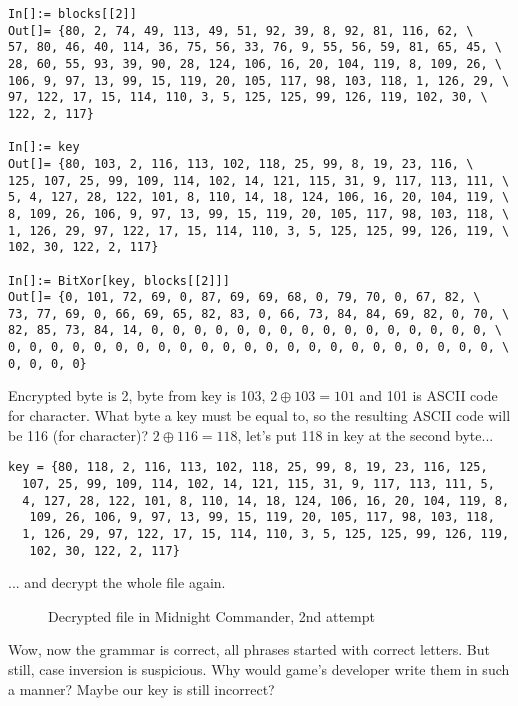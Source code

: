 \begin{lstlisting}
In[]:= blocks[[2]]
Out[]= {80, 2, 74, 49, 113, 49, 51, 92, 39, 8, 92, 81, 116, 62, \
57, 80, 46, 40, 114, 36, 75, 56, 33, 76, 9, 55, 56, 59, 81, 65, 45, \
28, 60, 55, 93, 39, 90, 28, 124, 106, 16, 20, 104, 119, 8, 109, 26, \
106, 9, 97, 13, 99, 15, 119, 20, 105, 117, 98, 103, 118, 1, 126, 29, \
97, 122, 17, 15, 114, 110, 3, 5, 125, 125, 99, 126, 119, 102, 30, \
122, 2, 117}

In[]:= key
Out[]= {80, 103, 2, 116, 113, 102, 118, 25, 99, 8, 19, 23, 116, \
125, 107, 25, 99, 109, 114, 102, 14, 121, 115, 31, 9, 117, 113, 111, \
5, 4, 127, 28, 122, 101, 8, 110, 14, 18, 124, 106, 16, 20, 104, 119, \
8, 109, 26, 106, 9, 97, 13, 99, 15, 119, 20, 105, 117, 98, 103, 118, \
1, 126, 29, 97, 122, 17, 15, 114, 110, 3, 5, 125, 125, 99, 126, 119, \
102, 30, 122, 2, 117}

In[]:= BitXor[key, blocks[[2]]]
Out[]= {0, 101, 72, 69, 0, 87, 69, 69, 68, 0, 79, 70, 0, 67, 82, \
73, 77, 69, 0, 66, 69, 65, 82, 83, 0, 66, 73, 84, 84, 69, 82, 0, 70, \
82, 85, 73, 84, 14, 0, 0, 0, 0, 0, 0, 0, 0, 0, 0, 0, 0, 0, 0, 0, 0, \
0, 0, 0, 0, 0, 0, 0, 0, 0, 0, 0, 0, 0, 0, 0, 0, 0, 0, 0, 0, 0, 0, 0, \
0, 0, 0, 0}
\end{lstlisting}

Encrypted byte is 2, byte from key is 103, $2 \oplus 103=101$ and 101 is ASCII code for  character.
What byte a key must be equal to, so the resulting ASCII code will be 116 (for  character)?
$2 \oplus 116=118$, let's put 118 in key at the second byte...

\begin{lstlisting}
key = {80, 118, 2, 116, 113, 102, 118, 25, 99, 8, 19, 23, 116, 125, 
  107, 25, 99, 109, 114, 102, 14, 121, 115, 31, 9, 117, 113, 111, 5, 
  4, 127, 28, 122, 101, 8, 110, 14, 18, 124, 106, 16, 20, 104, 119, 8,
   109, 26, 106, 9, 97, 13, 99, 15, 119, 20, 105, 117, 98, 103, 118, 
  1, 126, 29, 97, 122, 17, 15, 114, 110, 3, 5, 125, 125, 99, 126, 119,
   102, 30, 122, 2, 117}
\end{lstlisting}

... and decrypt the whole file again.

\begin{figure}[H]
\centering
{}
\caption{Decrypted file in Midnight Commander, 2nd attempt}
\end{figure}

Wow, now the grammar is correct, all phrases started with correct letters.
But still, case inversion is suspicious.
Why would game's developer write them in such a manner?
Maybe our key is still incorrect?

